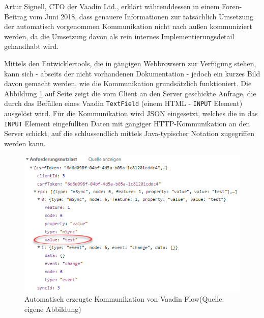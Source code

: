 \documentclass[a4paper,12pt,twoside]{scrreprt}
\begin{document}
\medskip

Artur Signell, CTO der Vaadin Ltd., erklärt währenddessen in einem Foren-Beitrag vom Juni 2018, dass genauere Informationen zur tatsächlich Umsetzung der automatisch vorgenommen Kommunikation nicht nach außen kommuniziert werden, da die Umsetzung davon als rein internes Implementierungsdetail gehandhabt wird. \parencite[][]{signell_explanation_2018}

\medskip

Mittels den Entwicklertools, die in gängigen Webbrowsern zur Verfügung stehen, kann sich - abseits der nicht vorhandenen Dokumentation - jedoch ein kurzes Bild davon gemacht werden, wie die Kommunikation grundsätzlich funktioniert. Die Abbildung \ref{fig:vaadin-json-communication} auf Seite \pageref{fig:vaadin-json-communication} zeigt die vom Client an den Server geschickte Anfrage, die durch das Befüllen eines Vaadin \texttt{TextField} (einem HTML - \texttt{INPUT} Element) ausgelöst wird. Für die Kommunikation wird \acs{JSON} eingesetzt, welches die in das \texttt{INPUT} Element eingefüllten Daten mit gängiger HTTP-Kommunikation an den Server schickt, auf die schlussendlich mittels Java-typischer Notation zugegriffen werden kann.

\begin{figure}[ht]
    \centering
    \includegraphics[scale=0.75]{images/Luidold_Vaadin-HTTP-communication.png}
    \caption[Automatisch erzeugte Kommunikation von Vaadin Flow]{Automatisch erzeugte Kommunikation von Vaadin Flow\newline(Quelle: eigene Abbildung)}
    \label{fig:vaadin-json-communication}
\end{figure}

\newpage
\end{document}
